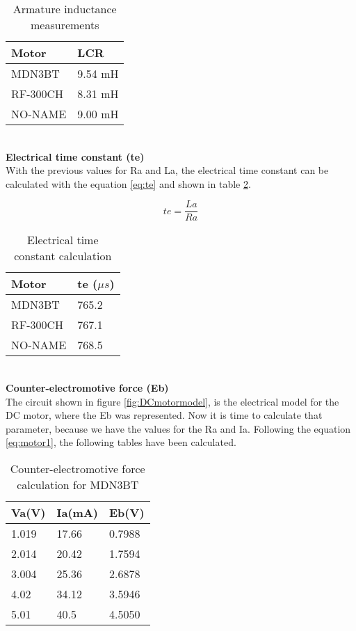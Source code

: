 \begin{table}[H]
\centering
\begin{tabular}{ | l | l | }
\hline\hline
	\textbf{Motor} & \textbf{LCR} \\ \hline
	MDN3BT & 9.54 mH \\ \hline
RF-300CH & 8.31 mH \\ \hline
NO-NAME & 9.00 mH  \\ \hline\hline 
\end{tabular}
\caption{Armature inductance measurements} \label{tab:La}
\end{table}
\\

\textbf{Electrical time constant (te)} \\
 With the previous values for Ra and La, the electrical time constant can be calculated with the equation \ref{eq:te} and shown in table \ref{tab:te}.

\begin{equation}
te=\frac{La}{Ra}
\label{eq:te}
\end{equation}

\begin{table}[H]
\centering
\begin{tabular}{ | l | l |}
\hline\hline
	\textbf{Motor} & \textbf{te ($\mu s$)} \\ \hline
	MDN3BT & 765.2 \\ \hline
RF-300CH & 767.1 \\ \hline
NO-NAME & 768.5 \\ \hline\hline 
\end{tabular}
\caption{Electrical time constant calculation} \label{tab:te}
\end{table}\\

\textbf{Counter-electromotive force (Eb)} \\
The circuit shown in figure \ref{fig:DCmotormodel}, is the electrical model for the \acrshort{DC} motor, where the Eb was represented. Now it is time to calculate that parameter, because we have the values for the Ra and Ia. Following the equation \ref{eq:motor1}, the following tables have been calculated.


\begin{table}[H]
\centering
\begin{tabular}{ | l | l | l |  }
\hline\hline
	\textbf{Va(V)} & \textbf{Ia(mA)} & \textbf{Eb(V)}  \\ \hline
	1.019 & 17.66  & 0.7988\\ \hline
	2.014 & 20.42  & 1.7594 \\ \hline
	3.004 & 25.36  & 2.6878 \\ \hline
	4.02 & 34.12 & 3.5946 \\ \hline
	5.01 & 40.5 & 4.5050 \\ \hline\hline
\end{tabular}
\caption{Counter-electromotive force calculation for MDN3BT} \label{tab:Eb1}
\end{table}

